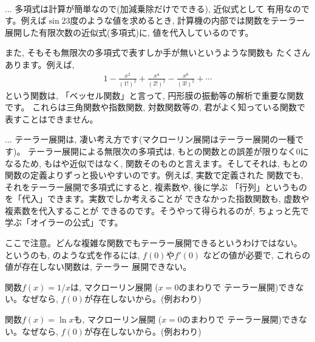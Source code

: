 \begin{faq}{\small {}\\
... 多項式は計算が簡単なので(加減乗除だけでできる), 近似式として
有用なのです。例えば$\sin 23\text{度}$のような値を求めるとき, 
計算機の内部では関数をテーラー展開した有限次数の近似式(多項式)に, 
値を代入しているのです。

また, そもそも無限次の多項式で表すしか手が無いというような関数も
たくさんあります。例えば, 
\begin{eqnarray*}
1-\frac{x^2}{(1!)^2}+\frac{x^4}{(2!)^2}-\frac{x^6}{(3!)^2}+\cdots
\end{eqnarray*}
という関数は, 「ベッセル関数」と言って, 円形膜の振動等の解析で重要な関数です。
これらは三角関数や指数関数, 対数関数等の, 君がよく知っている関数で
表すことはできません。}\end{faq}


\begin{faq}{\small {} ... 
テーラー展開は, 凄い考え方です(マクローリン展開はテーラー展開の一種です)。
テーラー展開による無限次の多項式は, もとの関数との誤差が限りなく0に
なるため, もはや近似ではなく, 関数そのものと言えます。そしてそれは, 
もとの関数の定義よりずっと扱いやすいのです。例えば, 実数で定義された
関数でも, それをテーラー展開で多項式にすると, 複素数や, 後に学ぶ
「行列」というものを「代入」できます。実数でしか考えることが
できなかった指数関数も, 虚数や複素数を代入することが
できるのです。そうやって得られるのが, ちょっと先で学ぶ「オイラーの公式」です。}\end{faq}

ここで注意。どんな複雑な関数でもテーラー展開できるというわけではない。
というのも, のような式を作るには, $f(0)$や$f'(0)$
などの値が必要で, これらの値が存在しない関数は, テーラー
展開できない。

\begin{exmpl} 関数$f(x)=1/x$は, マクローリン展開 ($x=0$のまわりで
テーラー展開)できない。なぜなら, $f(0)$が存在しないから。(例おわり)\end{exmpl}

\begin{exmpl} 関数$f(x)=\ln x$も, マクローリン展開 ($x=0$のまわりで
テーラー展開)できない。なぜなら, $f(0)$が存在しないから。(例おわり)\end{exmpl}

